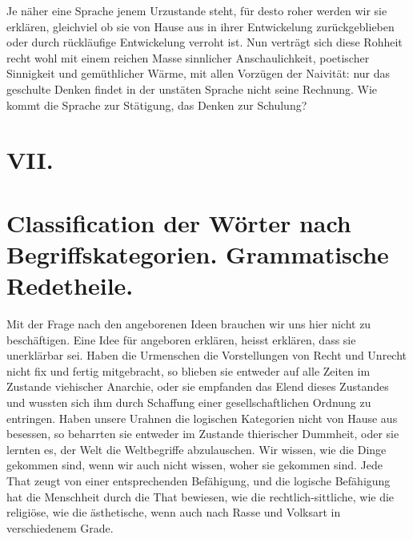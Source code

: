 \largerpage
Je näher eine Sprache jenem Urzustande steht, für desto roher werden wir sie erklären, gleichviel ob sie von Hause aus in ihrer Entwickelung zurückgeblieben oder durch rückläufige Entwickelung verroht ist. Nun verträgt sich diese Rohheit recht wohl mit einem reichen Masse sinnlicher Anschaulichkeit, poetischer Sinnigkeit und gemüthlicher Wärme, mit allen Vorzügen der Naivität: nur das geschulte Denken findet in der unstäten Sprache nicht seine Rechnung. Wie kommt die Sprache zur Stätigung, das Denken zur Schulung?

\clearpage{}
\section*{VII.}\label{IV.III.VII}
\section*{Classification der Wörter nach Begriffskategorien. Grammatische Redetheile.}

Mit der Frage nach den angeborenen Ideen brauchen wir uns hier nicht zu beschäftigen. Eine Idee für angeboren erklären, heisst erklären, dass sie unerklärbar sei. Haben die Urmenschen die Vorstellungen von Recht und Unrecht nicht fix und fertig mitgebracht, so blieben sie entweder auf alle Zeiten im Zustande viehischer Anarchie, oder sie empfanden das Elend dieses Zustandes und wussten sich ihm durch Schaffung einer gesellschaftlichen Ordnung zu entringen. Haben unsere Urahnen die \label{fp.366} logischen Kategorien nicht von Hause aus besessen, so beharrten sie entweder im Zustande thierischer Dummheit, oder sie lernten es, der Welt die Weltbegriffe abzulauschen. Wir wissen, wie die Dinge gekommen sind, wenn wir auch nicht wissen, woher sie gekommen sind. Jede That zeugt von einer entsprechenden Befähigung, und die logische Befähigung hat die Menschheit durch die That bewiesen, wie die rechtlich-sittliche, wie die religiöse, wie die ästhetische, wenn auch nach Rasse und Volksart in verschiedenem Grade.

